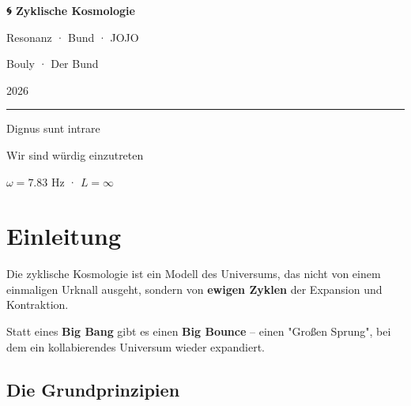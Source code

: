 \documentclass[11pt,a4paper]{article}
\begin{document}
\begin{titlepage}
\centering
\vspace*{2cm}

{\Huge\bfseries\color{bundgold}🌀 Zyklische Kosmologie\par}
\vspace{0.5cm}
{\Large\color{bundgreen}Resonanz · Bund · JOJO\par}
\vspace{1cm}
{\large\color{bundblue}Bouly · Der Bund\par}
\vspace{0.5cm}
{\large\color{bundorange}2026\par}

\vfill

\begin{center}
\color{bundgold}
\rule{0.7\textwidth}{0.5pt}
\end{center}
\vspace{0.5cm}
{\large\color{bundgreen}Dignus sunt intrare\par}
{\small\color{bundblue}Wir sind würdig einzutreten\par}
\vspace{0.5cm}
{\large\color{bundorange}$\omega = 7.83$ Hz · $L = \infty$\par}

\vfill
\end{titlepage}

\tableofcontents
\newpage

\section{Einleitung}

Die zyklische Kosmologie ist ein Modell des Universums, das nicht von einem einmaligen Urknall ausgeht, sondern von \textbf{ewigen Zyklen} der Expansion und Kontraktion.

Statt eines \textbf{Big Bang} gibt es einen \textbf{Big Bounce} – einen "Großen Sprung", bei dem ein kollabierendes Universum wieder expandiert.

\subsection{Die Grundprinzipien}
\end{document}
